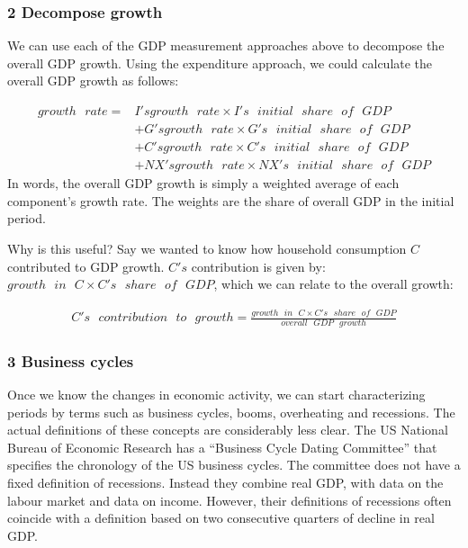 \documentclass[
]{book}
\begin{document}
\hypertarget{decompose-growth}{%
\subsubsection*{2 Decompose growth}\label{decompose-growth}}

We can use each of the GDP measurement approaches above to decompose the overall GDP growth. Using the expenditure approach, we could calculate the overall GDP growth as follows:

\begin{align}
growth\text{ }rate=&I's growth\text{ }rate\times I's\text{ }initial\text{ }share\text{ }of\text{ }GDP\\
                   &+G's growth\text{ }rate\times G's\text{ }initial\text{ }share\text{ }of\text{ }GDP\\
                   &+C's growth\text{ }rate\times C's\text{ }initial\text{ }share\text{ }of\text{ }GDP\\
                   &+NX's growth\text{ }rate\times NX's\text{ }initial\text{ }share\text{ }of\text{ }GDP
\end{align}
In words, the overall GDP growth is simply a weighted average of each component's growth rate. The weights are the share of overall GDP in the initial period.

Why is this useful? Say we wanted to know how household consumption \(C\) contributed to GDP growth. \(C's\) contribution is given by: \(growth\text{ }in\text{ }C\times C's\text{ }share\text{ }of\text{ }GDP\), which we can relate to the overall growth:

\begin{align}
C's\text{ }contribution\text{ }to\text{ }growth=\frac{growth\text{ }in\text{ }C\times C's\text{ }share\text{ }of\text{ }GDP}{overall\text{ }GDP\text{ }growth}
\end{align}

\hypertarget{business-cycles}{%
\subsubsection*{3 Business cycles}\label{business-cycles}}

Once we know the changes in economic activity, we can start characterizing periods by terms such as business cycles, booms, overheating and recessions. The actual definitions of these concepts are considerably less clear. The US National Bureau of Economic Research has a ``Business Cycle Dating Committee'' that specifies the chronology of the US business cycles. The committee does not have a fixed definition of recessions. Instead they combine real GDP, with data on the labour market and data on income. However, their definitions of recessions often coincide with a definition based on two consecutive quarters of decline in real GDP.
\end{document}
